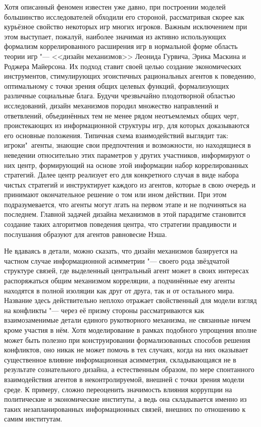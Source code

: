 Хотя описанный феномен известен уже давно, при построении моделей большинство исследователей обходили его стороной, рассматривая скорее как курьёзное свойство некоторых игр многих игроков. Важным исключением при этом выступает, пожалуй, наиболее значимая из активно использующих формализм коррелированного расширения игр в нормальной форме область теории игр "--- <<дизайн механизмов>> \ifsynopsis\smartcite{Nikolenko}\else\cite{Nikolenko}\fi Леонида Гурвича, Эрика Маскина и Роджера Майерсона. Их подход ставит своей целью создание экономических инструментов, стимулирующих эгоистичных рациональных агентов к поведению, оптимальному с точки зрения общих целевых функций, формализующих различные социальные блага. Будучи чрезвычайно плодотворной областью исследований, дизайн механизмов породил множество направлений и ответвлений, объединённых тем не менее рядом неотъемлемых общих черт, проистекающих из информационной структуры игр, для которых доказываются его основные положения. Типичная схема взаимодействий выглядит так: игроки"~агенты, знающие свои предпочтения и возможности, но находящиеся в неведении относительно этих параметров у других участников, информируют о них центр, формирующий на основе этой информации набор коррелированных стратегий. Далее центр реализует его для конкретного случая в виде набора чистых стратегий и инструктирует каждого из агентов, которые в свою очередь и принимают окончательное решение о том или ином действии. При этом подразумевается, что агенты могут лгать на первом этапе и не подчиняться на последнем. Главной задачей дизайна механизмов в этой парадигме становится создание таких алгоритмов поведения центра, что стратегии правдивости и послушания образуют для агентов равновесие Нэша.

Не вдаваясь в детали, можно сказать, что дизайн механизмов базируется на частном случае информационной асимметрии "--- своего рода звёздчатой структуре связей, где выделенный центральный агент может в своих интересах распоряжаться общим механизмом корреляции, а подчинённые ему агенты находятся в полной изоляции как друг от друга, так и от остального мира. Название здесь действительно неплохо отражает свойственный для модели взгляд на конфликты "--- через её призму стороны рассматриваются как взаимозаменимые детали единого рукотворного механизма, не связанные ничем кроме участия в нём. Хотя моделирование в рамках подобного упрощения вполне может быть полезно при конструировании формализованных способов решения конфликтов, оно никак не может помочь в тех случаях, когда на них оказывает существенное влияние информационная асимметрия, складывающаяся не в результате сознательного дизайна, а естественным образом, по мере спонтанного взаимодействия агентов в неконтролируемой, внешней с точки зрения модели среде. К примеру, сложно переоценить значимость влияния коррупции на политические и экономические институты, а ведь она складывается именно из таких незапланированных информационных связей, внешних по отношению к самим институтам.

